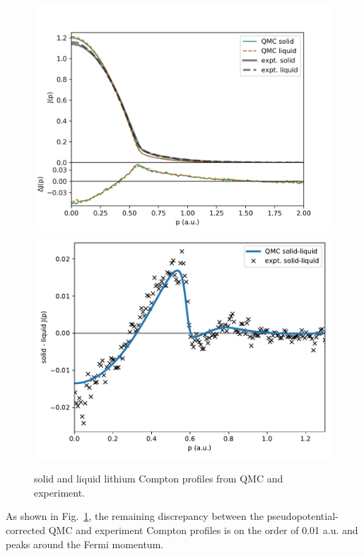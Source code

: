 \documentclass[aps,prb,showpacs,preprintnumbers,amsmath,amssymb,superscriptaddress,twocolumn]{revtex4}
\begin{document}
\begin{figure}[ht]
\includegraphics[scale=0.49]{figures/li52e_sl-jp}
\includegraphics[scale=0.49]{figures/li52e_sl-djp}
\caption{solid and liquid lithium Compton profiles from QMC and experiment.\label{fig:sl-jp-djp}}
\end{figure}

As shown in Fig.~\ref{fig:sl-jp-djp}, the remaining discrepancy between the pseudopotential-corrected QMC and experiment Compton profiles is on the order of 0.01 a.u. and peaks around the Fermi momentum.
\end{document}
